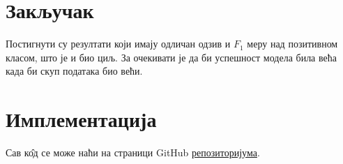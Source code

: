 \documentclass[12pt, a4paper]{article}
\begin{document}
\section{Закључак}
	Постигнути су резултати који имају одличан одзив и $F_1$ меру над позитивном класом, што је и био циљ. За очекивати је да би успешност модела била већа када би скуп података био већи.

\section{Имплементација}
	Сав к\^{о}д се може наћи на страници GitHub \hyperref{http://www.github.com/4eyes4u/HRAnalytics}{category}{name}{репозиторијума}.
\end{document}
